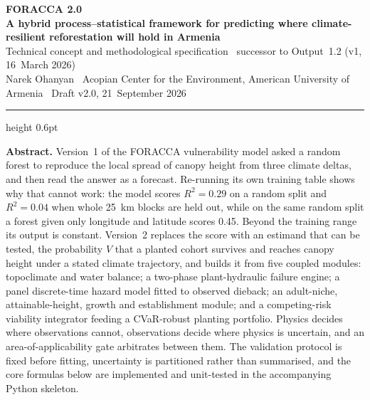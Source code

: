 \thispagestyle{plain}
{\raggedright
{\sffamily\bfseries\Huge\color{navy} FORACCA 2.0}\\[3pt]
{\sffamily\bfseries\Large A hybrid process--statistical framework for predicting where climate-resilient reforestation will hold in Armenia}\\[4pt]
{\sffamily\small\color{slate} Technical concept and methodological specification \textperiodcentered\ successor to Output~1.2 (v1, 16~March 2026)}\\[3pt]
{\sffamily\small Narek Ohanyan \textperiodcentered\ Acopian Center for the Environment, American University of Armenia \textperiodcentered\ Draft v2.0, 21~September 2026}\par}
\vspace{4pt}
\hrule height 0.6pt
\vspace{6pt}

\begin{tcolorbox}[enhanced,colback=mist,colframe=mist,boxrule=0pt,arc=1.5pt,left=7pt,right=7pt,top=5pt,bottom=5pt]
\textbf{\sffamily Abstract.} Version~1 of the FORACCA vulnerability model asked a random forest to reproduce the local spread of canopy height from three climate deltas, and then read the answer as a forecast. Re-running its own training table shows why that cannot work: the model scores $R^2=0.29$ on a random split and $R^2=0.04$ when whole 25~km blocks are held out, while on the same random split a forest given only longitude and latitude scores 0.45. Beyond the training range its output is constant. Version~2 replaces the score with an estimand that can be tested, the probability $V$ that a planted cohort survives and reaches canopy height under a stated climate trajectory, and builds it from five coupled modules: topoclimate and water balance; a two-phase plant-hydraulic failure engine; a panel discrete-time hazard model fitted to observed dieback; an adult-niche, attainable-height, growth and establishment module; and a competing-risk viability integrator feeding a CVaR-robust planting portfolio. Physics decides where observations cannot, observations decide where physics is uncertain, and an area-of-applicability gate arbitrates between them. The validation protocol is fixed before fitting, uncertainty is partitioned rather than summarised, and the core formulas below are implemented and unit-tested in the accompanying Python skeleton.
\end{tcolorbox}

